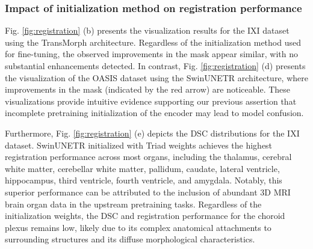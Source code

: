 \subsubsection{Impact of initialization method on registration performance}

Fig. \ref{fig:registration} (b) presents the visualization results for the IXI dataset using the TransMorph architecture.
Regardless of the initialization method used for fine-tuning, the observed  improvements in the mask appear similar, with no substantial enhancements detected.
In contrast, Fig. \ref{fig:registration} (d) presents the visualization of the OASIS dataset using the SwinUNETR architecture, where improvements in the mask (indicated by the red arrow) are noticeable.
These visualizations provide intuitive evidence supporting our previous assertion that incomplete pretraining initialization of the encoder may lead to model confusion.

Furthermore, Fig. \ref{fig:registration} (e) depicts the DSC distributions for the IXI dataset.
SwinUNETR initialized with Triad weights achieves the highest registration performance across most organs, including the thalamus, cerebral white matter, cerebellar white matter, pallidum, caudate, lateral ventricle, hippocampus, third ventricle, fourth ventricle, and amygdala.
Notably, this superior performance can be attributed to the inclusion of abundant 3D MRI brain organ data in the upstream pretraining tasks.
Regardless of the initialization weights, the DSC and registration performance for the choroid plexus remains low, likely due to its complex anatomical attachments to surrounding structures and its diffuse morphological characteristics.

